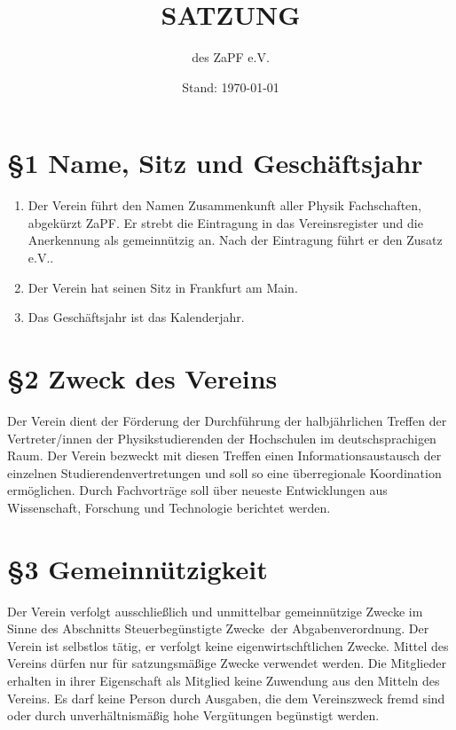 \documentclass[ngerman]{article}
\begin{document}
\title{SATZUNG}
\date{Stand: \today}

\author{des \textquotedbl{}ZaPF
e.V.\textquotedbl{}}

\maketitle



\section*{§1 Name, Sitz und Geschäftsjahr}
\begin{enumerate}
\item Der Verein führt den Namen \glqq Zusammenkunft aller Physik Fachschaften\grqq, abgekürzt \glqq ZaPF\grqq. Er strebt die Eintragung in das Vereinsregister und die Anerkennung als gemeinnützig an. Nach der Eintragung führt er den Zusatz \glqq e.V.\grqq.
\item Der Verein hat seinen Sitz in Frankfurt am Main.
\item Das Geschäftsjahr ist das Kalenderjahr.
\end{enumerate}


\section*{§2 Zweck des Vereins}
Der Verein dient der Förderung der Durchführung der halbjährlichen Treffen der Vertreter/innen der Physikstudierenden der Hochschulen im deutschsprachigen Raum.
Der Verein bezweckt mit diesen Treffen einen Informationsaustausch der einzelnen Studierendenvertretungen und soll so eine überregionale Koordination ermöglichen. Durch Fachvorträge soll über neueste Entwicklungen aus Wissenschaft, Forschung und Technologie berichtet werden.


\section*{§3 Gemeinnützigkeit}
Der Verein verfolgt ausschließlich und unmittelbar gemeinnützige Zwecke im Sinne des Abschnitts \glqq Steuerbegünstigte Zwecke\grqq\ der Abgabenverordnung. Der Verein ist selbstlos tätig, er verfolgt keine eigenwirtschftlichen Zwecke. Mittel des Vereins dürfen nur für satzungsmäßige Zwecke verwendet werden. Die Mitglieder erhalten in
ihrer Eigenschaft als Mitglied keine Zuwendung aus den Mitteln des Vereins. Es darf keine Person durch Ausgaben, die dem Vereinszweck fremd sind oder durch unverhältnismäßig hohe Vergütungen begünstigt werden.
\end{document}
